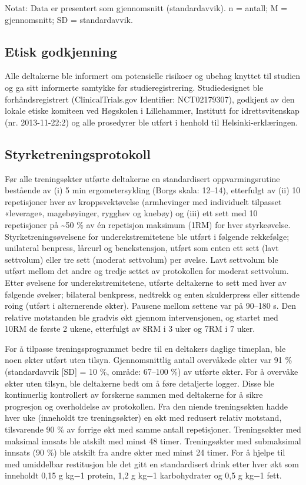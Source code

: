 \documentclass[
  letterpaper,
  DIV=11,
  numbers=noendperiod]{scrreprt}
\begin{document}
Notat: Data er presentert som gjennomsnitt (standardavvik). n = antall;
M = gjennomsnitt; SD = standardavvik.

\hypertarget{etisk-godkjenning}{%
\subsection{Etisk godkjenning}\label{etisk-godkjenning}}

Alle deltakerne ble informert om potensielle risikoer og ubehag knyttet
til studien og ga sitt informerte samtykke før studieregistrering.
Studiedesignet ble forhåndsregistrert (ClinicalTrials.gov Identifier:
NCT02179307), godkjent av den lokale etiske komiteen ved Høgskolen i
Lillehammer, Institutt for idrettsvitenskap (nr. 2013-11-22:2) og alle
prosedyrer ble utført i henhold til Helsinki-erklæringen.

\hypertarget{styrketreningsprotokoll}{%
\subsection{Styrketreningsprotokoll}\label{styrketreningsprotokoll}}

Før alle treningsøkter utførte deltakerne en standardisert
oppvarmingsrutine bestående av (i) 5 min ergometersykling (Borgs skala:
12--14), etterfulgt av (ii) 10 repetisjoner hver av kroppsvektøvelse
(armhevinger med individuelt tilpasset «leverage», magebøyinger, rygghev
og knebøy) og (iii) ett sett med 10 repetisjoner på \textasciitilde50 \%
av én repetisjon maksimum (1RM) for hver styrkeøvelse.
Styrketreningsøvelsene for underekstremitetene ble utført i følgende
rekkefølge; unilateral benpress, lårcurl og benekstensjon, utført som
enten ett sett (lavt settvolum) eller tre sett (moderat settvolum) per
øvelse. Lavt settvolum ble utført mellom det andre og tredje settet av
protokollen for moderat settvolum. Etter øvelsene for
underekstremitetene, utførte deltakerne to sett med hver av følgende
øvelser; bilateral benkpress, nedtrekk og enten skulderpress eller
sittende roing (utført i alternerende økter). Pausene mellom settene var
på 90--180 s. Den relative motstanden ble gradvis økt gjennom
intervensjonen, og startet med 10RM de første 2 ukene, etterfulgt av 8RM
i 3 uker og 7RM i 7 uker.

For å tilpasse treningsprogrammet bedre til en deltakers daglige
timeplan, ble noen økter utført uten tilsyn. Gjennomsnittlig antall
overvåkede økter var 91 \% (standardavvik {[}SD{]} = 10 \%, område:
67--100 \%) av utførte økter. For å overvåke økter uten tilsyn, ble
deltakerne bedt om å føre detaljerte logger. Disse ble kontinuerlig
kontrollert av forskerne sammen med deltakerne for å sikre progresjon og
overholdelse av protokollen. Fra den niende treningsøkten hadde hver uke
(inneholdt tre treningsøkter) en økt med redusert relativ motstand,
tilsvarende 90 \% av forrige økt med samme antall repetisjoner.
Treningsøkter med maksimal innsats ble atskilt med minst 48 timer.
Treningsøkter med submaksimal innsats (90 \%) ble atskilt fra andre
økter med minst 24 timer. For å hjelpe til med umiddelbar restitusjon
ble det gitt en standardisert drink etter hver økt som inneholdt 0,15 g
kg−1 protein, 1,2 g kg−1 karbohydrater og 0,5 g kg−1 fett.
\end{document}
